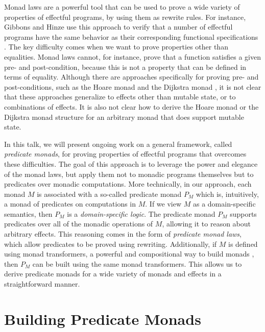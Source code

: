 \documentclass[preprint]{sigplanconf}
\begin{document}
Monad laws are a powerful tool that can be used to prove a wide variety of
properties of effectful programs, by using them as rewrite rules. For instance,
Gibbons and Hinze use this approach to verify that a number of effectful
programs have the same behavior as their corresponding functional specifications
\cite{gibbons11}.
%
The key difficulty comes when we want to prove properties other than equalities.
Monad laws cannot, for instance, prove that a function satisfies a given pre-
and post-condition, because this is not a property that can be defined in terms
of equality. Although there are approaches specifically for proving pre- and
post-conditions, such as the Hoare monad \cite{nanevski08} and the Dijkstra
monad \cite{swamy13}, it is not clear that these approaches generalize to
effects other than mutable state, or to combinations of effects.
It is also not clear how to derive the Hoare monad or the Dijkstra monad
structure for an arbitrary monad that does support mutable state.


In this talk, we will present ongoing work on a general framework, called
\emph{predicate monads}, for proving properties of effectful programs that
overcomes these difficulties. The goal of this approach is to leverage the power
and elegance of the monad laws, but apply them not to monadic programs
themselves but to predicates over monadic computations.  More technically, in
our approach, each monad $M$ is associated with a so-called predicate monad $P_M$
which is, intuitively, a monad of predicates on computations in $M$.
If we view $M$ as a domain-specific semantics, then $P_M$ is a
\emph{domain-specific logic}.
The predicate monad $P_M$ supports predicates over all of the monadic operations
of $M$, allowing it to reason about arbitrary effects. This reasoning comes in
the form of \emph{predicate monad laws}, which allow predicates to be proved
using rewriting. Additionally, if $M$ is defined using monad transformers, a
powerful and compositional way to build monads \cite{liang95}, then $P_M$ can be
built using the same monad transformers. This allows us to derive predicate
monads for a wide variety of monads and effects in a straightforward manner.


\section{Building Predicate Monads}
\end{document}

